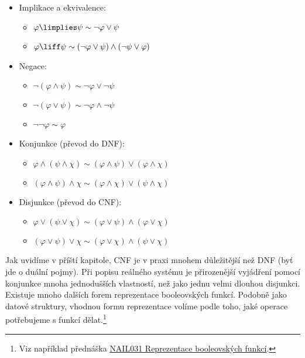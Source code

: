 \begin{tcolorbox}
\begin{multicols}{2}
\begin{itemize}
    \item Implikace a ekvivalence:
    \begin{itemize}
        \item[] $\varphi\limplies\psi\sim\neg\varphi\lor\psi$
        \item[] $\varphi\liff\psi\sim(\neg\varphi\lor\psi)\land(\neg\psi\lor\varphi)$
    \end{itemize}
    \item Negace:
    \begin{itemize}
        \item[] $\neg(\varphi\land\psi)\sim\neg\varphi\lor\neg\psi$
        \item[] $\neg(\varphi\lor\psi)\sim\neg\varphi\land\neg\psi$
        \item[] $\neg\neg\varphi\sim\varphi$
    \end{itemize}
    \item Konjunkce (převod do DNF):
    \begin{itemize}
        \item[] $\varphi \land (\psi\land\chi) \sim (\varphi\land\psi)\lor (\varphi\land\chi)$
        \item[] $(\varphi \land \psi)\land\chi \sim (\varphi\land\chi)\lor (\psi\land\chi)$
    \end{itemize}
    \item Disjunkce (převod do CNF):
    \begin{itemize}
        \item[] $\varphi \lor (\psi\lor\chi) \sim (\varphi\lor\psi)\land (\varphi\lor\chi)$
        \item[] $(\varphi \lor \psi)\lor\chi \sim (\varphi\lor\chi)\land (\psi\lor\chi)$
    \end{itemize}
\end{itemize}
\end{multicols}
\end{tcolorbox}


Jak uvidíme v příští kapitole, CNF je v praxi mnohem důležitější než DNF (byť jde o duální pojmy). Při popisu reálného systému je přirozenější vyjádření pomocí konjunkce mnoha jednodušších vlastností, než jako jednu velmi dlouhou disjunkci. Existuje mnoho dalších forem reprezentace booleovských funkcí. Podobně jako datové struktury, vhodnou formu reprezentace volíme podle toho, jaké operace potřebujeme s funkcí dělat.\footnote{Viz například přednáška \href{https://is.cuni.cz/studium/predmety/index.php?do=predmet&kod=NAIL031}{NAIL031 Reprezentace booleovských funkcí}.}


